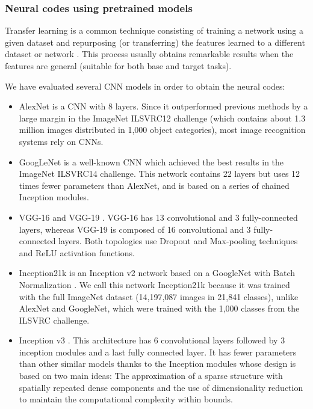 \documentclass[final, twocolumn]{elsarticle}
\begin{document}
\subsubsection{Neural codes using pretrained models}
\label{sec:ncpm}

Transfer learning is a common technique consisting of training a network using a given dataset and repurposing (or transferring) the features learned to a different dataset or network \cite{Yosinski2014How}. This process usually obtains remarkable results when the features are general (suitable for both base and target tasks).

We have evaluated several CNN models in order to obtain the neural codes:

\begin{itemize}
\item AlexNet \cite{Krizhevsky2012ImageNetNetworks} is a CNN with 8 layers. Since it outperformed previous methods by a large margin in the ImageNet ILSVRC12 \citep{Russakovsky2014ImageNetChallenge} challenge (which contains about 1.3 million images distributed in 1,000 object categories), most image recognition systems rely on CNNs.

\item GoogLeNet \cite{Szegedy2014GoingConvolutions} is a well-known CNN which achieved the best results in the ImageNet ILSVRC14 challenge. This network contains 22 layers but uses 12 times fewer parameters than AlexNet, and is based on a series of chained Inception modules.

\item VGG-16 and VGG-19 \cite{Simonyan14}. VGG-16 has 13 convolutional and 3 fully-connected layers, whereas VGG-19 is composed of 16 convolutional and 3 fully-connected layers. Both topologies use Dropout and Max-pooling techniques and ReLU activation functions.

\item Inception21k is an Inception v2 network based on a GoogleNet with Batch Normalization \cite{Ioffe15:ArXiv}. We call this network Inception21k because it was trained with the full ImageNet dataset (14,197,087 images in 21,841 classes), unlike AlexNet and GoogleNet, which were trained with the 1,000 classes from the ILSVRC challenge.

\item Inception v3 \cite{inceptionv3}. This architecture has 6 convolutional layers followed by 3 inception modules and a last fully connected layer. It has fewer parameters than other similar models thanks to the Inception modules whose design is based on two main ideas: The approximation of a sparse structure with spatially repeated dense components and the use of dimensionality reduction to maintain the computational complexity within bounds.


\end{itemize}
\end{document}
